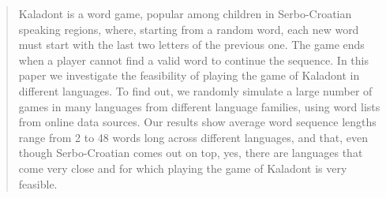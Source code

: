 \begin{abstract}
Kaladont is a word game, popular among children in Serbo-Croatian speaking regions, where, starting from a random word, each new word must start with the last two letters of the previous one.
The game ends when a player cannot find a valid word to continue the sequence. In this paper we investigate the feasibility of playing the game of Kaladont in different languages. To find out, we randomly simulate a large number of games in many languages from different language families, using  word lists from online data sources.
Our results show average word sequence lengths range from 2 to 48 words long across different languages, and that, even though Serbo-Croatian comes out on top, yes, there are languages that come very close and for which playing the game of Kaladont is very feasible.
\end{abstract}
